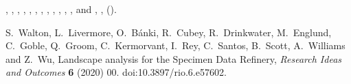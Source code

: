 \documentclass[ds,v1.1.2,openaccess]{iosart2x}%
\begin{document}
\begin{thebibliography}{}
%
\begin{barticle}
,
,
,
,
,
,
,
,
,
,
,
,
 and
,
,
().
\end{barticle}
%
\OrigBibText
S.~Walton,
L.~Livermore,
O.~B\'{a}nki,
R.~Cubey,
R.~Drinkwater,
M.~Englund,
C.~Goble,
Q.~Groom,
C.~Kermorvant,
I.~Rey,
C.~Santos,
B.~Scott,
A.~Williams and
Z.~Wu,
Landscape analysis for the Specimen Data Refinery,
\textit{Research Ideas and Outcomes}
\textbf{6}
(2020)
00.
doi:10.3897/rio.6.e57602.
\endOrigBibText
{}
\endbibitem


\end{thebibliography}
\end{document}
